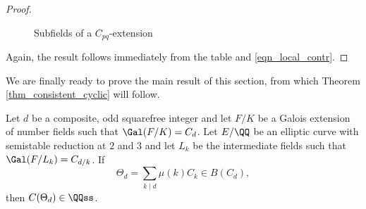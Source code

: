 \begin{proof}
\begin{figure}[!ht]
        \caption[short]{Subfields of a $C_{pq}$-extension}
    \end{figure}

    Again, the result follows immediately from the table and \eqref{eqn_local_contr}.
    
\end{proof}

We are finally ready to prove the main result of this section, from which Theorem \ref{thm_consistent_cyclic} will follow. 

\begin{lemma}\label{lem_Cd_odd}
    Let $d$ be a composite, odd squarefree integer and let $F/K$ be a Galois extension of number fields such that $\Gal(F/K)=C_{d}$. Let $E/\QQ$ be an elliptic curve with semistable reduction at $2$ and $3$ and let $L_k$ be the intermediate fields such that $\Gal(F/L_k)=C_{d/k}$. If 
    $$\Theta_d=\sum_{k\mid d}\mu(k)C_k\in B(C_d),$$
    then $C(\Theta_d)\in\QQss$.
\end{lemma}

